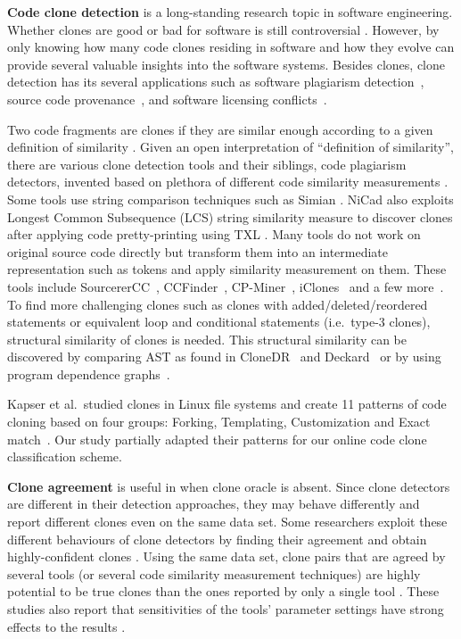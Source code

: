 \documentclass[sigconf,review, anonymous]{acmart}
\begin{document}
\textbf{Code clone detection} is a long-standing research topic in software engineering. Whether clones are good or bad for software is still controversial \cite{Sajnani2016,Kapser2003,Kapser2008,Krinke2008,Hotta2010,Gode2011,Harder2013}. However, by only knowing how many code clones residing in software and how they evolve \cite{Pate2013,Mondal2011} can provide several valuable insights into the software systems. Besides clones, clone detection has its several applications such as software plagiarism detection~\cite{Prechelt2002}, 
source code provenance~\cite{Davies2013}, and software licensing conflicts~\cite{German2009}.

Two code fragments are clones if they are similar enough according to a given definition of similarity \cite{Bellon2007}. Given an open interpretation of ``definition of similarity'', there are various clone detection tools and their siblings, code plagiarism detectors, invented based on plethora of different code similarity measurements \cite{Roy2008, Ragkhitwetsagul2016,Svajlenko2014}. Some tools
use string comparison techniques such as Simian \cite{simian}. NiCad \cite{Roy2008,Cordy} also exploits Longest Common Subsequence (LCS) string similarity measure to discover clones after applying code pretty-printing using TXL \cite{Cordy2006}. Many tools do not work on original source code directly but transform them into an
intermediate representation such as tokens and apply similarity
measurement on them. These tools include SourcererCC~\cite{Sajnani2016}, CCFinder~\cite{Kamiya2002},
CP-Miner~\cite{Li2006}, iClones~\cite{Gode2009} and a few more~\cite{Burrows2007, Smith2009, Duric2012, Prechelt2002, Schleimer2003}. 
To find more challenging clones such as clones with added/deleted/reordered statements or equivalent loop and conditional statements (i.e.~type-3 clones), structural similarity of clones is needed.
This structural similarity can be discovered by comparing AST as found in CloneDR~\cite{Baxter1998} and Deckard~\cite{Jiang2007a} or by using program dependence
graphs~\cite{Krinke2001,Komondoor2001}. 

Kapser et al.~studied clones in Linux file systems and create 11 patterns of code cloning based on four groups: Forking, Templating, Customization and Exact match~\cite{Kapser2003,Kapser2008}. Our study partially adapted their patterns for our online code clone classification scheme.

\textbf{Clone agreement} is useful in when clone oracle is absent. Since clone detectors are different in their detection approaches, they may behave differently and report different clones even on the same data set. Some researchers exploit these different behaviours of clone detectors by finding their agreement and obtain highly-confident clones \cite{Bellon2007,Wang2013}. Using the same data set, clone pairs that are agreed by several tools (or several code similarity measurement techniques) are highly potential to be true clones than the ones reported by only a single tool \cite{Wang2013,cr2016ssbse,Funaro2010}. These studies also report that sensitivities of the tools' parameter settings have strong effects to the results \cite{Wang2013,cr2016ssbse}.
\end{document}
